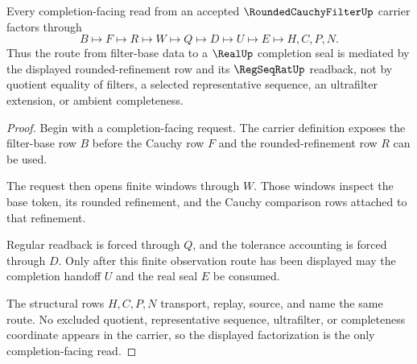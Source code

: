 \begin{theorem}\label{thm:rounded-cauchy-filter-regular-readback-route}
Every completion-facing read from an accepted $\RoundedCauchyFilterUp$ carrier factors through
$$
B \longmapsto F \longmapsto R \longmapsto W \longmapsto Q \longmapsto D \longmapsto U \longmapsto E \longmapsto H,C,P,N .
$$
Thus the route from filter-base data to a $\RealUp$ completion seal is mediated by the displayed rounded-refinement row and its $\RegSeqRatUp$ readback, not by quotient equality of filters, a selected representative sequence, an ultrafilter extension, or ambient completeness.
\end{theorem}
\begin{proof}
Begin with a completion-facing request. The carrier definition exposes the filter-base row $B$ before the Cauchy row $F$ and the rounded-refinement row $R$ can be used.

The request then opens finite windows through $W$. Those windows inspect the base token, its rounded refinement, and the Cauchy comparison rows attached to that refinement.

Regular readback is forced through $Q$, and the tolerance accounting is forced through $D$. Only after this finite observation route has been displayed may the completion handoff $U$ and the real seal $E$ be consumed.

The structural rows $H,C,P,N$ transport, replay, source, and name the same route. No excluded quotient, representative sequence, ultrafilter, or completeness coordinate appears in the carrier, so the displayed factorization is the only completion-facing read.
\end{proof}

